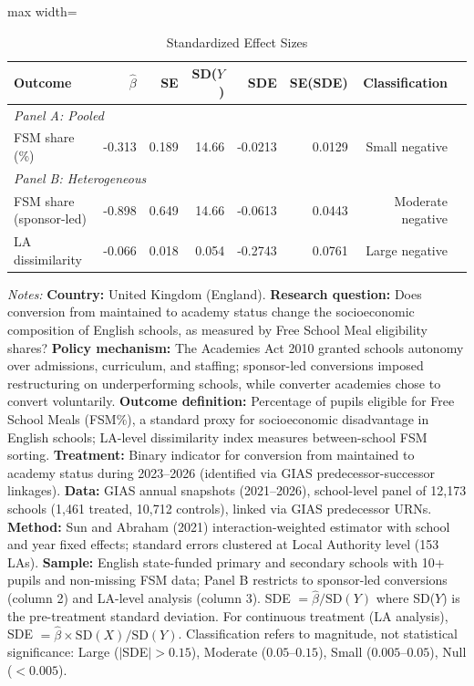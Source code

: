 \begin{table}[htbp]
\centering
\caption{Standardized Effect Sizes}
\label{tab:sde}
\begin{adjustbox}{max width=\textwidth}
\begin{tabular}{lrrrrrrr}
\toprule
Outcome & $\hat{\beta}$ & SE & SD($Y$) & SDE & SE(SDE) & Classification \\
\midrule
\multicolumn{7}{l}{\textit{Panel A: Pooled}} \\
FSM share (\%) & -0.313 & 0.189 & 14.66 & -0.0213 & 0.0129 & Small negative \\
\midrule
\multicolumn{7}{l}{\textit{Panel B: Heterogeneous}} \\
FSM share (sponsor-led) & -0.898 & 0.649 & 14.66 & -0.0613 & 0.0443 & Moderate negative \\
LA dissimilarity & -0.066 & 0.018 & 0.054 & -0.2743 & 0.0761 & Large negative \\
\bottomrule
\end{tabular}
\end{adjustbox}
\begin{tablenotes}
\item \textit{Notes:} \textbf{Country:} United Kingdom (England). \textbf{Research question:} Does conversion from maintained to academy status change the socioeconomic composition of English schools, as measured by Free School Meal eligibility shares? \textbf{Policy mechanism:} The Academies Act 2010 granted schools autonomy over admissions, curriculum, and staffing; sponsor-led conversions imposed restructuring on underperforming schools, while converter academies chose to convert voluntarily. \textbf{Outcome definition:} Percentage of pupils eligible for Free School Meals (FSM\%), a standard proxy for socioeconomic disadvantage in English schools; LA-level dissimilarity index measures between-school FSM sorting. \textbf{Treatment:} Binary indicator for conversion from maintained to academy status during 2023--2026 (identified via GIAS predecessor-successor linkages). \textbf{Data:} GIAS annual snapshots (2021--2026), school-level panel of 12,173 schools (1,461 treated, 10,712 controls), linked via GIAS predecessor URNs. \textbf{Method:} Sun and Abraham (2021) interaction-weighted estimator with school and year fixed effects; standard errors clustered at Local Authority level (153 LAs). \textbf{Sample:} English state-funded primary and secondary schools with 10+ pupils and non-missing FSM data; Panel B restricts to sponsor-led conversions (column 2) and LA-level analysis (column 3). SDE $= \hat{\beta} / \text{SD}(Y)$ where SD($Y$) is the pre-treatment standard deviation. For continuous treatment (LA analysis), SDE $= \hat{\beta} \times \text{SD}(X) / \text{SD}(Y)$. Classification refers to magnitude, not statistical significance: Large ($|$SDE$| > 0.15$), Moderate ($0.05$--$0.15$), Small ($0.005$--$0.05$), Null ($< 0.005$).
\end{tablenotes}
\end{table}

